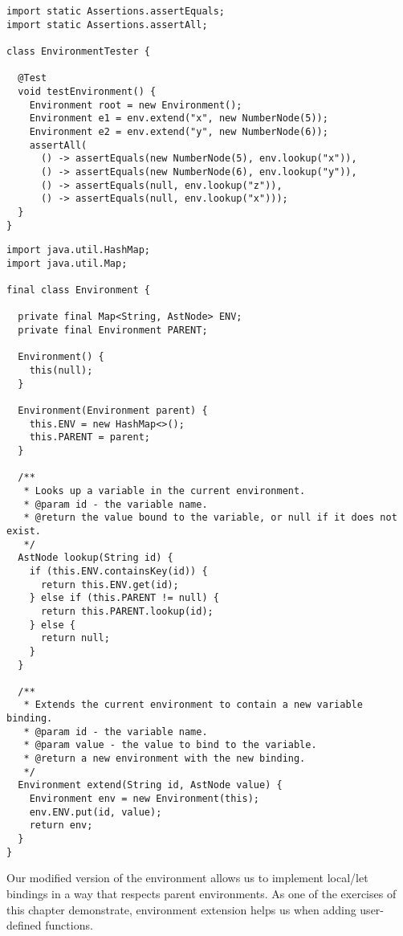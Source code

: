 \begin{lstlisting}[language=MyJava]
import static Assertions.assertEquals;
import static Assertions.assertAll;

class EnvironmentTester {
  
  @Test
  void testEnvironment() {
    Environment root = new Environment();
    Environment e1 = env.extend("x", new NumberNode(5));
    Environment e2 = env.extend("y", new NumberNode(6));
    assertAll(
      () -> assertEquals(new NumberNode(5), env.lookup("x")),
      () -> assertEquals(new NumberNode(6), env.lookup("y")),
      () -> assertEquals(null, env.lookup("z")),
      () -> assertEquals(null, env.lookup("x")));
  }
}
\end{lstlisting}
  
\begin{lstlisting}[language=MyJava]
import java.util.HashMap;
import java.util.Map;

final class Environment {

  private final Map<String, AstNode> ENV;
  private final Environment PARENT;

  Environment() { 
    this(null); 
  }

  Environment(Environment parent) { 
    this.ENV = new HashMap<>(); 
    this.PARENT = parent; 
  }

  /**
   * Looks up a variable in the current environment.
   * @param id - the variable name.
   * @return the value bound to the variable, or null if it does not exist.
   */
  AstNode lookup(String id) {
    if (this.ENV.containsKey(id)) { 
      return this.ENV.get(id); 
    } else if (this.PARENT != null) { 
      return this.PARENT.lookup(id); 
    } else { 
      return null; 
    }
  }

  /**
   * Extends the current environment to contain a new variable binding.
   * @param id - the variable name.
   * @param value - the value to bind to the variable.
   * @return a new environment with the new binding.
   */
  Environment extend(String id, AstNode value) {
    Environment env = new Environment(this);
    env.ENV.put(id, value);
    return env;
  }
}
\end{lstlisting} 

Our modified version of the environment allows us to implement local/let bindings in a way that respects parent environments. As one of the exercises of this chapter demonstrate, environment extension helps us when adding user-defined functions.

